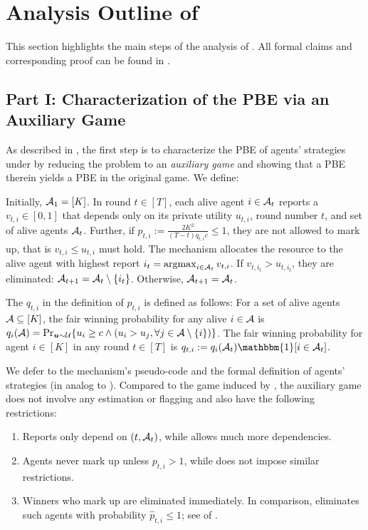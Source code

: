 \section{Analysis Outline of \mechname}\label{sec:sketch varying-p}
This section highlights the main steps of the analysis of \mechname. All formal claims and corresponding proof can be found in .

\subsection{Part I: Characterization of the PBE via an Auxiliary Game}
As described in , the first step is to characterize the PBE of agents' strategies under \mechname by reducing the problem to an \textit{auxiliary game} and showing that a PBE therein yields a PBE in the original game. We define:
\begin{definition}\label{def:auxiliary game}
    Initially, $\mathcal{A}_1=[K]$. In round $t\in [T]$, each alive agent $i\in \mathcal{A}_t$ reports a $v_{t,i}\in [0,1]$ that depends only on its private utility $u_{t,i}$, round number $t$, and set of alive agents $\mathcal{A}_t$. Further, if $p_{t,i}:= \frac{2K^2}{(T-t)q_{t,i} c} \leq 1$, they are not allowed to mark up, that is $v_{t,i}\le u_{t,i}$ must hold. The mechanism allocates the resource to the alive agent with highest report $i_t=\argmax_{i\in \mA_t} v_{t,i}$. If $v_{t,i_t}>u_{t,i_t}$, they are eliminated: $\mathcal{A}_{t+1}=\mathcal{A}_t\setminus \{i_t\}$. Otherwise, $\mathcal{A}_{t+1}=\mathcal{A}_t$.

    The $q_{t,i}$ in the definition of $p_{t,i}$ is defined as follows: For a set of alive agents $\mathcal{A}\subseteq [K]$, the fair winning probability for any alive $i\in \mathcal{A}$ is $q_i(\mathcal{A}) = \Pr_{\bm u\sim\mathcal{U}}\{u_{i}\ge c\wedge (u_{i}>u_{j},\forall j\in \mathcal{A}\setminus \{i\})\}$. The fair winning probability for agent $i\in [K]$ in any round $t\in [T]$ is $q_{t,i}:=q_i(\mA_t) \mathbbm{1}[i\in \mA_t]$.
\end{definition}
We defer to  the mechanism's pseudo-code and the formal definition of agents' strategies (in analog to ). Compared to the game induced by \mechname, the auxiliary game does not involve any estimation or flagging and also have the following restrictions:
\begin{enumerate}
\item Reports only depend on $(t,\mathcal{A}_t)$, while  allows much more dependencies. \label{item:only simplified history}
\item Agents never mark up unless $p_{t,i}>1$, while  does not impose similar restrictions. \label{item:no mark up unless p>=1}
\item Winners who mark up are eliminated immediately. In comparison, \mechname eliminates such agents with probability $\hat p_{t,i}\le 1$; see  of .\label{item:eliminate immediately}
\end{enumerate}
